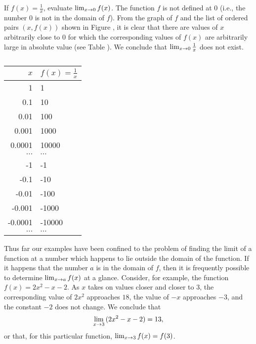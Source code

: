 \begin{example}\label{exam 1.4.2}
If $f(x) = \frac{1}{x}$,
evaluate
$\lim_{x \rightarrow 0} f(x)$.
The function $f$ is not defined at $0$
(i.e., the number 0 is not in the domain of $f$).
From the graph of $f$ and the list of ordered pairs $(x, f(x))$
shown in Figure ,
it is clear that there are values of $x$
arbitrarily close to 0 for which the 
corresponding values of $f(x)$
are arbitrarily large in absolute value
(see Table ).
We conclude that
$\lim_{x \rightarrow 0}{\frac{1}{x}}$ does not exist.

\begin{table}\label{table 1.5}
\centering
\begin{tabular}{r|l} \hline
$x$  & $f(x) = \frac{1}{x}$  \vspace {1ex}\\ \hline
1        &  1        \\
0.1      &  10       \\
0.01     &  100      \\
0.001    &  1000     \\
0.0001   &  10000    \\
$\cdots$   &  $\cdots$   \\
-1        &  -1        \\
-0.1      &  -10       \\
-0.01     &  -100      \\
-0.001    &  -1000     \\
-0.0001   &  -10000    \\
$\cdots$   &  $\cdots$   \\ \hline
\end{tabular}
\caption{}
\end{table}
\end{example}

Thus far our examples have been confined to
the problem of finding the limit of a function
at a number which happens to lie outside
the domain of the function.
If it happens that the number $a$
is in the domain of $f$,
then it is frequently possible to determine
$\lim_{x \rightarrow a}f(x)$ at a glance.
Consider, for example,
the function
$f(x) = 2x^2 - x - 2$.
As $x$ takes on values closer and closer to 3,
the corresponding value of
$2x^{2}$ approaches $18$,
the value of $-x$ approaches $-3$,
and the constant $-2$ does not change.
We conclude that
\[
\lim_{x \rightarrow 3} {(2x^2 - x - 2)} = 13,
\]
or that, for this particular function, $\lim_{x \rightarrow 3}f(x) = f(3)$.

